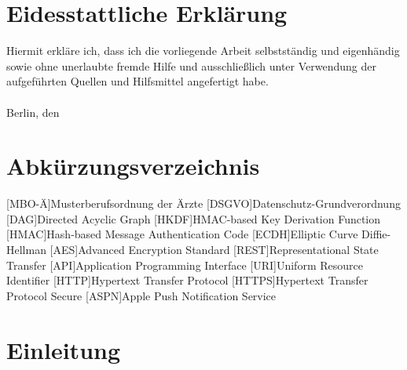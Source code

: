     \newpage
    \chapter*{Eidesstattliche Erklärung}\label{ch:eidesstattliche-erklarung}
    Hiermit erkläre ich, dass ich die vorliegende Arbeit selbstständig und eigenhändig sowie ohne
    unerlaubte fremde Hilfe und ausschließlich unter Verwendung der aufgeführten Quellen und
    Hilfsmittel angefertigt habe.\\
    \vspace{1cm}\\
    Berlin, den \underline{\hspace{3cm}} \hfill \DeinName \underline{\hspace{4cm}}

    \newpage
    \tableofcontents

    \newpage
    \chapter*{Abkürzungsverzeichnis}
    \begin{acronym}[DSGVO]
        [MBO-Ä]{Musterberufsordnung der Ärzte}
        [DSGVO]{Datenschutz-Grundverordnung}
        [DAG]{Directed Acyclic Graph}
        [HKDF]{HMAC-based Key Derivation Function}
        [HMAC]{Hash-based Message Authentication Code}
        [ECDH]{Elliptic Curve Diffie-Hellman}
        [AES]{Advanced Encryption Standard}
        [REST]{Representational State Transfer}
        [API]{Application Programming Interface}
        [URI]{Uniform Resource Identifier}
        [HTTP]{Hypertext Transfer Protocol}
        [HTTPS]{Hypertext Transfer Protocol Secure}
        [ASPN]{Apple Push Notification Service}
    \end{acronym}

    \mainmatter

    \newpage
    \chapter{Einleitung}\label{ch:einleitung}

